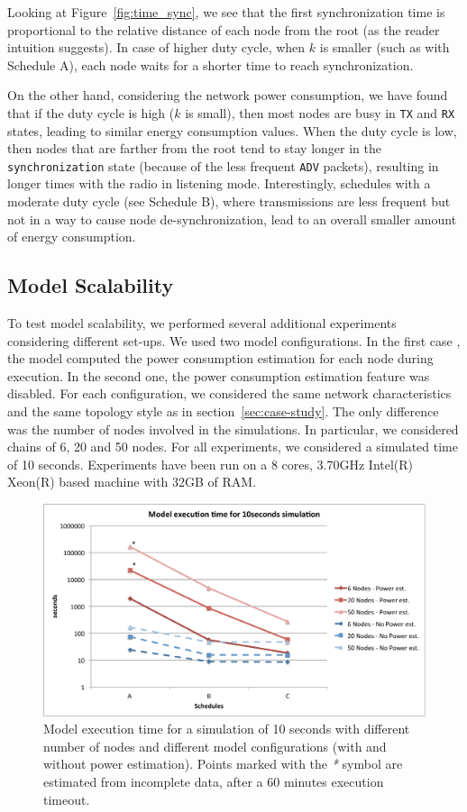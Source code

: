 Looking at Figure~\ref{fig:time_sync}, we see that the first synchronization time is proportional to the relative distance of each node from the root (as the reader intuition suggests). In case of higher duty cycle, when $k$ is smaller (such as with Schedule A), each node waits for a shorter time to reach synchronization. 

On the other hand, considering the network power consumption, we have found that if the duty cycle is high ($k$ is small), then most nodes are busy in \texttt{TX} and \texttt{RX} states, leading to similar energy consumption values. When the duty cycle is low, then nodes that are farther from the root tend to stay longer in the \texttt{synchronization} state (because of the less frequent \texttt{ADV} packets), resulting in longer times with the radio in listening mode. Interestingly, schedules with a moderate duty cycle (see Schedule B), where transmissions are less frequent but not in a way to cause node de-synchronization, lead to an overall smaller amount of energy consumption. \cite{vilajosana2013realistic}

\subsection{Model Scalability}
\label{sec:scalability}

To test model scalability, we performed several additional experiments considering different set-ups.
We used two model configurations. In the first case , the model computed the power consumption estimation for each node during execution. In the second one, the power consumption estimation feature was disabled.
For each configuration, we considered the same network characteristics and the same topology style as in section~\ref{sec:case-study}. The only difference was the number of nodes involved in the simulations. In particular, we considered chains of 6, 20 and 50 nodes.
For all experiments, we considered a simulated time of 10 seconds.
Experiments have been run on a 8 cores, 3.70GHz Intel(R) Xeon(R) based machine with 32GB of RAM.

\begin{figure}[t]
\centering
\includegraphics[width=0.9\columnwidth]{figures/runtime}
\caption{Model execution time for a simulation of 10 seconds with different number of nodes and different model configurations (with and without power estimation). Points marked with the \emph{*} symbol are estimated from incomplete data, after a 60 minutes execution timeout.}
\label{fig:runtime}
\end{figure}

